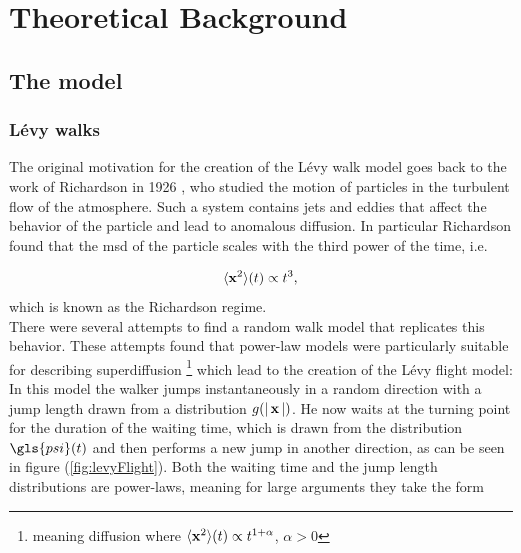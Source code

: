 \chapter{Theoretical Background}

\section{The model}

\subsection{L\'evy walks}

The original motivation for the creation of the L\'evy walk model goes back to the work of Richardson in 1926 \cite{richardson}, who studied the motion of particles in the turbulent flow of the atmosphere. Such a system contains jets and eddies that affect the behavior of the particle and lead to anomalous diffusion. In particular Richardson found that the \gls{msd} of the particle scales with the third power of the time, i.e.

\begin{align}
\langle \mathbf{ x }^2 \rangle(t) \propto t^3 ,
\end{align}
%
which is known as the Richardson regime.\\

There were several attempts to find a random walk model that replicates this behavior. These attempts found that power-law models were particularly suitable for describing superdiffusion \footnote{meaning diffusion where $\langle \mathbf{ x }^2 \rangle(t) \propto t^{1+\alpha}$, $\alpha>0$} which lead to the creation of the L\'evy flight model: In this model the walker jumps instantaneously in a random direction with a jump length drawn from a distribution $g(\left|\,\mathbf{ x }\,\right|)$. He now waits at the turning point for the duration of the waiting time, which is drawn from the distribution $\gls{psi}(t)$ and then performs a new jump in another direction, as can be seen in figure (\ref{fig:levyFlight}). Both the waiting time and the jump length distributions are power-laws, meaning for large arguments they take the form 

